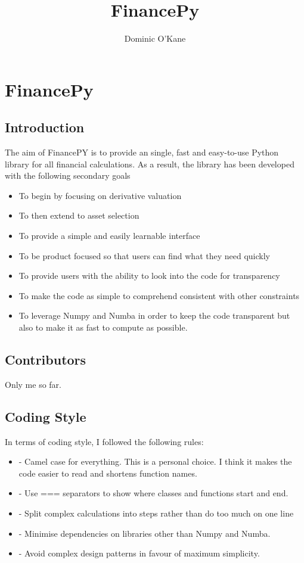 \documentclass[twoside,11pt]{book}
\begin{document}
\title{{\Huge \bf FinancePy}}
\author{Dominic O'Kane}

\maketitle 

\cleardoublepage

\setcounter{tocdepth}{1}
\tableofcontents

\setcounter{page}{1}

\chapter{FinancePy}

\section{Introduction}
The aim of FinancePY is to provide an single, fast and easy-to-use Python library for all financial calculations. As a result, the library has been developed with the following secondary goals
\begin{itemize}
\item To begin by focusing on derivative valuation
\item To then extend to asset selection 
\item To provide a simple and easily learnable interface
\item To be product focused so that users can find what they need quickly
\item To provide users with the ability to look into the code for transparency
\item To make the code as simple to comprehend consistent with other constraints
\item To leverage Numpy and Numba in order to keep the code transparent but also to make it as fast to compute as possible.
\end{itemize}

\section{Contributors}
Only me so far.

\section{Coding Style}
In terms of coding style, I followed the following rules:
\begin{itemize}
\item- Camel case for everything. This is a personal choice. I think it makes the code easier to read and shortens function names.
\item- Use === separators to show where classes and functions start and end.
\item- Split complex calculations into steps rather than do too much on one line
\item- Minimise dependencies on libraries other than Numpy and Numba.
\item- Avoid complex design patterns in favour of maximum simplicity.
\end{itemize}
\end{document}

